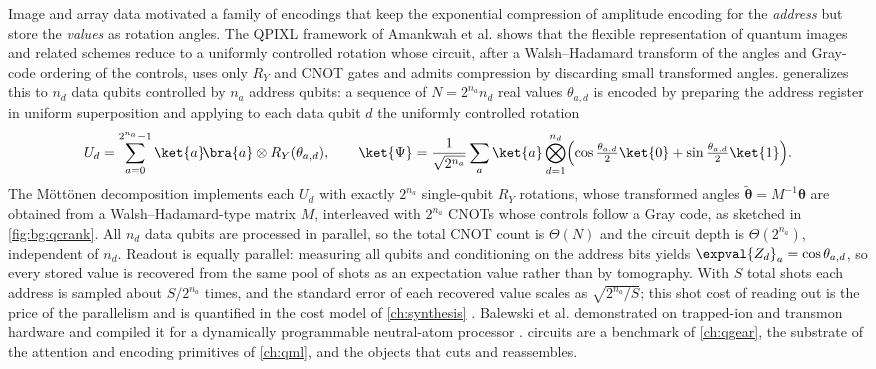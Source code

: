 Image and array data motivated a family of encodings that keep the exponential compression of amplitude encoding for the \emph{address} but store the \emph{values} as rotation angles. The QPIXL framework of Amankwah et al. \cite{amankwah2022qpixl} shows that the flexible representation of quantum images and related schemes reduce to a uniformly controlled rotation whose circuit, after a Walsh--Hadamard transform of the angles and Gray-code ordering of the controls, uses only $R_Y$ and CNOT gates and admits compression by discarding small transformed angles. \qcrank{} \cite{balewski2024qcrank} generalizes this to $n_d$ data qubits controlled by $n_a$ address qubits: a sequence of $N=2^{n_a}n_d$ real values $\theta_{a,d}$ is encoded by preparing the address register in uniform superposition and applying to each data qubit $d$ the uniformly controlled rotation
\begin{equation}\label{eq:bg:ucr}
U_d=\sum_{a=0}^{2^{n_a}-1}\ket{a}\!\bra{a}\otimes R_Y(\theta_{a,d}),\qquad
\ket{\Psi}=\frac{1}{\sqrt{2^{n_a}}}\sum_{a}\ket{a}\bigotimes_{d=1}^{n_d}\Bigl(\cos\tfrac{\theta_{a,d}}{2}\ket{0}+\sin\tfrac{\theta_{a,d}}{2}\ket{1}\Bigr).
\end{equation}
The M{\"o}tt{\"o}nen decomposition \cite{mottonen2004ucr} implements each $U_d$ with exactly $2^{n_a}$ single-qubit $R_Y$ rotations, whose transformed angles $\tilde{\bm{\theta}}=M^{-1}\bm{\theta}$ are obtained from a Walsh--Hadamard-type matrix $M$, interleaved with $2^{n_a}$ CNOTs whose controls follow a Gray code, as sketched in \cref{fig:bg:qcrank}. All $n_d$ data qubits are processed in parallel, so the total CNOT count is $\Theta(N)$ and the circuit depth is $\Theta(2^{n_a})$, independent of $n_d$. Readout is equally parallel: measuring all qubits and conditioning on the address bits yields $\expval{Z_d}_a=\cos\theta_{a,d}$, so every stored value is recovered from the same pool of shots as an expectation value rather than by tomography. With $S$ total shots each address is sampled about $S/2^{n_a}$ times, and the standard error of each recovered value scales as $\sqrt{2^{n_a}/S}$; this shot cost of reading out is the price of the parallelism and is quantified in the cost model of \cref{ch:synthesis} \cite{guo2026nonlinearwaves}. Balewski et al. demonstrated \qcrank{} on trapped-ion and transmon hardware \cite{balewski2024qcrank} and compiled it for a dynamically programmable neutral-atom processor \cite{balewski2025qcrankdpqa}. \qcrank{} circuits are a benchmark of \cref{ch:qgear}, the substrate of the attention and encoding primitives of \cref{ch:qml}, and the objects that \shardq{} cuts and reassembles.


